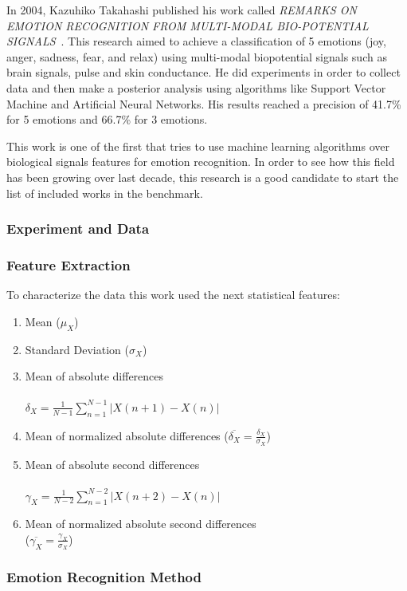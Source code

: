 \documentclass{sig-alternate}
\begin{document}
In 2004, Kazuhiko Takahashi published his work called \textit{REMARKS ON EMOTION RECOGNITION FROM MULTI-MODAL BIO-POTENTIAL SIGNALS}~\cite{takahashi2004}. This research aimed to achieve a classification of 5 emotions (joy, anger, sadness, fear, and relax) using multi-modal biopotential signals such as brain signals, pulse and skin conductance. He did experiments in order to collect data and then make a posterior analysis using algorithms like Support Vector Machine and Artificial Neural Networks. His results reached a precision of 41.7\% for 5 emotions and 66.7\% for 3 emotions. 

This work is one of the first that tries to use machine learning algorithms over biological signals features for emotion recognition. In order to see how this field has been growing over last decade, this research is a good candidate to start the list of included works in the benchmark.  

\subsubsection{Experiment and Data}


\subsubsection{Feature Extraction}

To characterize the data this work used the next statistical features:
\begin{enumerate}
\item Mean ($\mu_{X}$)
\item Standard Deviation ($\sigma_{X}$)
\item Mean of absolute differences \\ \\ $\delta_{X} = \frac{1}{N-1} \sum^{N-1}_{n=1}|X(n+1)-X(n)|$
\item Mean of normalized absolute differences ($\overline{\delta_{X}} = \frac{\delta_{X}}{\sigma_{X}}$)
\item Mean of absolute second differences \\ \\ $\gamma_{X} = \frac{1}{N-2} \sum^{N-2}_{n=1}|X(n+2)-X(n)|$
\item Mean of normalized absolute second differences \\ ($\overline{\gamma_{X}} = \frac{\gamma_{X}}{\sigma_{X}}$)
\end{enumerate}  

\subsubsection{Emotion Recognition Method}
	
\end{document}
